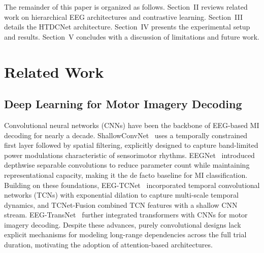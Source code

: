\documentclass[conference]{IEEEtran}
\begin{document}
The remainder of this paper is organized as follows. Section~II reviews related work on hierarchical EEG architectures and contrastive learning. Section~III details the HTDCNet architecture. Section~IV presents the experimental setup and results. Section~V concludes with a discussion of limitations and future work.

\section{Related Work}

\subsection{Deep Learning for Motor Imagery Decoding}
Convolutional neural networks (CNNs) have been the backbone of EEG-based MI decoding for nearly a decade.
ShallowConvNet~\cite{schirrmeister2017deep} uses a temporally constrained first layer followed by spatial filtering, explicitly designed to capture band-limited power modulations characteristic of sensorimotor rhythms.
EEGNet~\cite{lawhern2018eegnet} introduced depthwise separable convolutions to reduce parameter count while maintaining representational capacity, making it the de facto baseline for MI classification.
Building on these foundations, EEG-TCNet~\cite{ingolfsson2020eeg} incorporated temporal convolutional networks (TCNs) with exponential dilation to capture multi-scale temporal dynamics, and TCNet-Fusion combined TCN features with a shallow CNN stream.
EEG-TransNet~\cite{ma2024eegtransnet} further integrated transformers with CNNs for motor imagery decoding.
Despite these advances, purely convolutional designs lack explicit mechanisms for modeling long-range dependencies across the full trial duration, motivating the adoption of attention-based architectures.
\end{document}
